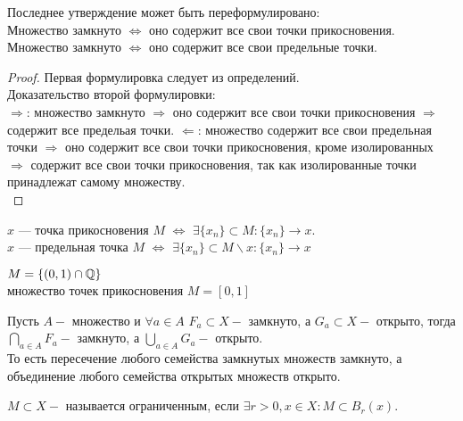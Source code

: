 \begin{remark}
	Последнее утверждение может быть переформулировано: \\
	Множество замкнуто $\Leftrightarrow$ оно содержит все свои точки прикосновения.\\
	Множество замкнуто $\Leftrightarrow$ оно содержит все свои предельные точки.\\
	\begin{proof}
		Первая формулировка следует из определений. \\
		Доказательство второй формулировки: \\
		$\Rightarrow$: множество замкнуто $\Rightarrow$ оно содержит все свои точки прикосновения $\Rightarrow$ содержит все предельая точки.
		$\Leftarrow$: множество содержит все свои предельная точки $\Rightarrow$ оно содержит все свои точки прикосновения, кроме изолированных $\Rightarrow$ содержит все свои точки прикосновения, так как изолированные точки принадлежат самому множеству. \\
	\end{proof}
\end{remark}

\begin{remark}
	$x$ — точка прикосновения $M$ $\Leftrightarrow$ $\exists \{ x_n \} \subset M : \{ x_n \} \to x$.\\
	$x$ — предельная точка $M$ $\Leftrightarrow$ $\exists \{ x_n \} \subset M \backslash x : \{ x_n \} \to x$
\end{remark}


\begin{exercise}
	$M = \{ (0, 1) \cap \mathbb{Q} \}$ \\
	множество точек прикосновения $M = [0, 1]$ \\
\end{exercise}

\begin{claim}
	Пусть $A -$ множество и $\forall a \in A$ $F_a \subset X - $ замкнуто, а $ G_a \subset X - $ открыто, тогда $\bigcap_{a\in A} F_a - $ замкнуто, а $\bigcup_{a\in A} G_a - $ открыто. \\
То есть пересечение любого семейства замкнутых множеств замкнуто, а объединение любого семейства открытых множеств открыто.
\end{claim}

\begin{definition}
	$M \subset X - $ называется ограниченным, если $\exists r>0, x \in X :  M \subset B_r(x)$.
\end{definition}

